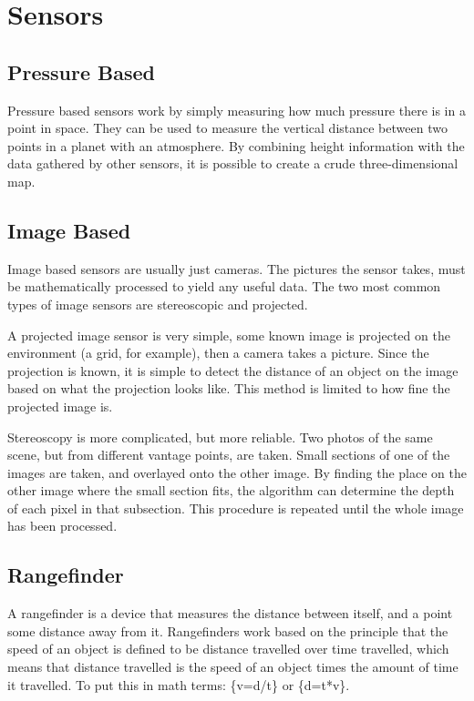\clearpage
\section{Sensors}
\subsection{Pressure Based}
Pressure based sensors work by simply measuring how much pressure there is in a point in space. They can be used to measure the vertical distance between two points in a planet with an atmosphere\cite{barometric1}\cite{barometric2}. By combining height information with the data gathered by other sensors, it is possible to create a crude three-dimensional map.

\subsection{Image Based}
Image based sensors are usually just cameras. The pictures the sensor takes, must be mathematically processed to yield any useful data. The two most common types of image sensors are stereoscopic and projected.

A projected image sensor is very simple, some known image is projected on the environment (a grid, for example), then a camera takes a picture. Since the projection is known, it is simple to detect the distance of an object on the image based on what the projection looks like. This method is limited to how fine the projected image is.

Stereoscopy is more complicated, but more reliable. Two photos of the same scene, but from different vantage points, are taken. Small sections of one of the images are taken, and overlayed onto the other image. By finding the place on the other image where the small section fits, the algorithm can determine the depth of each pixel in that subsection. This procedure is repeated until the whole image has been processed.

\subsection{Rangefinder}%
A rangefinder is a device that measures the distance between itself, and a point some distance away from it. Rangefinders work based on the principle that the speed of an object is defined to be distance travelled over time travelled, which means that distance travelled is the speed of an object times the amount of time it travelled. To put this in math terms: \{v=d/t\} or \{d=t*v\}.


